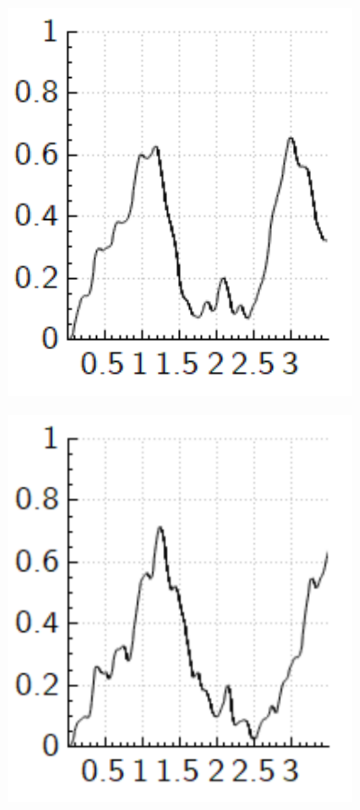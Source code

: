 \documentclass[a4paper, twocolumn]{revtex4-1}
\begin{document}
\begin{figure}
	\begin{subfigure}{0.45\columnwidth}
		\includegraphics[width=\columnwidth]{graphics/exploration/betaNonOptFidelityBeta7.PNG}
	\end{subfigure}
	\begin{subfigure}{0.45\columnwidth}
		\includegraphics[width=\columnwidth]{graphics/exploration/betaNonOptFidelityBeta12.PNG}

\end{subfigure}
\end{figure}
\end{document}
